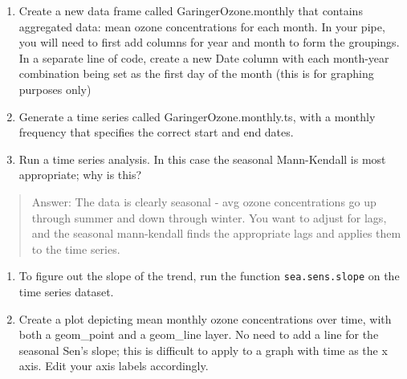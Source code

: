\documentclass[
]{article}
\begin{document}
\begin{enumerate}
\def\labelenumi{\arabic{enumi}.}
\setcounter{enumi}{8}
\item
  Create a new data frame called GaringerOzone.monthly that contains
  aggregated data: mean ozone concentrations for each month. In your
  pipe, you will need to first add columns for year and month to form
  the groupings. In a separate line of code, create a new Date column
  with each month-year combination being set as the first day of the
  month (this is for graphing purposes only)
\item
  Generate a time series called GaringerOzone.monthly.ts, with a monthly
  frequency that specifies the correct start and end dates.
\item
  Run a time series analysis. In this case the seasonal Mann-Kendall is
  most appropriate; why is this?
\end{enumerate}

\begin{quote}
Answer: The data is clearly seasonal - avg ozone concentrations go up
through summer and down through winter. You want to adjust for lags, and
the seasonal mann-kendall finds the appropriate lags and applies them to
the time series.
\end{quote}

\begin{enumerate}
\def\labelenumi{\arabic{enumi}.}
\setcounter{enumi}{11}
\item
  To figure out the slope of the trend, run the function
  \texttt{sea.sens.slope} on the time series dataset.
\item
  Create a plot depicting mean monthly ozone concentrations over time,
  with both a geom\_point and a geom\_line layer. No need to add a line
  for the seasonal Sen's slope; this is difficult to apply to a graph
  with time as the x axis. Edit your axis labels accordingly.
\end{enumerate}
\end{document}
